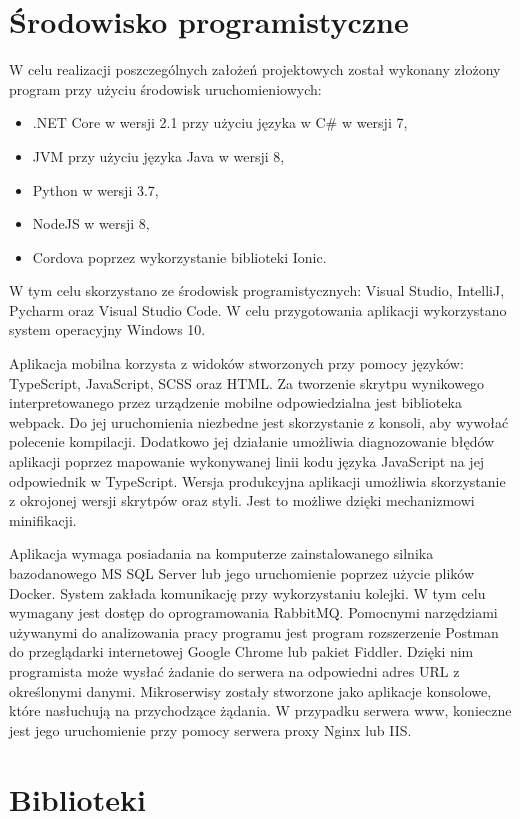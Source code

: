 \section{Środowisko programistyczne}
W celu realizacji poszczególnych założeń projektowych został wykonany złożony program przy użyciu środowisk uruchomieniowych: 
\begin{itemize}[noitemsep]
	\item .NET Core w wersji 2.1 przy użyciu języka w C\# w wersji 7,
	\item JVM przy użyciu języka Java w wersji 8,
	\item Python w wersji 3.7,
	\item NodeJS w wersji 8,
	\item Cordova poprzez wykorzystanie biblioteki Ionic.
\end{itemize}
W tym celu skorzystano ze środowisk programistycznych: Visual Studio, IntelliJ, Pycharm oraz Visual Studio Code. W celu przygotowania aplikacji wykorzystano system operacyjny Windows 10.

Aplikacja mobilna korzysta z widoków stworzonych przy pomocy języków: TypeScript, JavaScript, SCSS oraz HTML. Za tworzenie skrytpu wynikowego interpretowanego przez urządzenie mobilne odpowiedzialna jest biblioteka webpack. Do jej uruchomienia niezbedne jest skorzystanie z konsoli, aby wywołać polecenie kompilacji. Dodatkowo jej działanie umożliwia diagnozowanie błędów aplikacji poprzez mapowanie wykonywanej linii kodu języka JavaScript na jej odpowiednik w TypeScript. Wersja produkcyjna aplikacji umożliwia skorzystanie z okrojonej wersji skrytpów oraz styli. Jest to możliwe dzięki mechanizmowi minifikacji.

Aplikacja wymaga posiadania na komputerze zainstalowanego silnika bazodanowego MS SQL Server lub jego uruchomienie poprzez użycie plików Docker. System zakłada komunikację przy wykorzystaniu kolejki. W tym celu wymagany jest dostęp do oprogramowania RabbitMQ. Pomocnymi narzędziami używanymi do analizowania pracy programu jest program rozszerzenie Postman\cite{Postman} do przeglądarki internetowej Google Chrome lub pakiet Fiddler\cite{Fiddler}. Dzięki nim programista może wysłać żadanie do serwera na odpowiedni adres URL z określonymi danymi. Mikroserwisy zostały stworzone jako aplikacje konsolowe, które nasłuchują na przychodzące żądania. W przypadku serwera www, konieczne jest jego uruchomienie przy pomocy serwera proxy Nginx lub IIS.


\section{Biblioteki}

